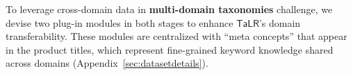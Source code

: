 
To leverage cross-domain data in \textbf{multi-domain taxonomies} challenge, we devise two plug-in modules 
in both stages 
to enhance $\mathsf{TaLR}$'s domain transferability. These modules are centralized with ``meta concepts'' that appear in 
the product titles, which represent fine-grained keyword knowledge 
shared across domains (Appendix~\ref{sec:datasetdetails}).
